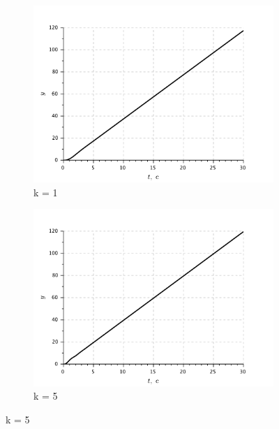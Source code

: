 \documentclass[a4paper, 11pt]{article}
\begin{document}
\begin{figure}[h!]
    \begin{subfigure}{0.5\textwidth}
        \centering
        \includegraphics[width = \textwidth]{images/graph2-2-K1.pdf}
        \caption{k = 1}
    \end{subfigure}
    \begin{subfigure}{0.5\textwidth}
        \centering
        \includegraphics[width = \textwidth]{images/graph2-2-K5.pdf}
        \caption{k = 5}
    \end{subfigure}


\end{figure}
\end{document}
